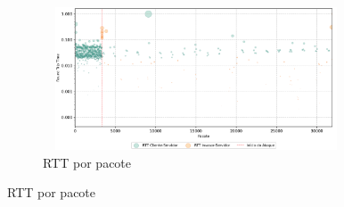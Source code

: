 \begin{apendicesenv}
\begin{figure}[htbp!]
\begin{subfigure}[t]{0.5\textwidth}
        \centering
        \caption{RTT por pacote}
        \includegraphics[width=1\textwidth, height=120pt]{USPSC-img/output/cropped/2-dos_function_call_null_deref-rttp.png}
    \end{subfigure}%
\end{figure}


\end{apendicesenv}
